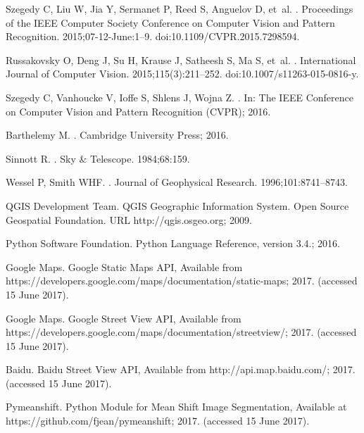 \documentclass[10pt,letterpaper]{article}
\begin{document}
\begin{thebibliography}{}
Szegedy C, Liu W, Jia Y, Sermanet P, Reed S, Anguelov D, et~al.
.
\newblock Proceedings of the IEEE Computer Society Conference on Computer
  Vision and Pattern Recognition. 2015;07-12-June:1--9.
\newblock doi:{10.1109/CVPR.2015.7298594}.

Russakovsky O, Deng J, Su H, Krause J, Satheesh S, Ma S, et~al.
.
\newblock International Journal of Computer Vision. 2015;115(3):211--252.
\newblock doi:{10.1007/s11263-015-0816-y}.

Szegedy C, Vanhoucke V, Ioffe S, Shlens J, Wojna Z.
.
\newblock In: The IEEE Conference on Computer Vision and Pattern Recognition
  (CVPR); 2016.

Barthelemy M.
.
\newblock Cambridge University Press; 2016.

Sinnott R.
.
\newblock Sky {\&} Telescope. 1984;68:159.

Wessel P, Smith WHF.
.
\newblock Journal of Geophysical Research. 1996;101:8741--8743.

{QGIS Development Team}. {QGIS Geographic Information System. Open Source
  Geospatial Foundation. URL http://qgis.osgeo.org}; 2009.

{Python Software Foundation}. {Python Language Reference, version 3.4.}; 2016.

{Google Maps}. {Google Static Maps API, Available from
  https://developers.google.com/maps/documentation/static-maps}; 2017.
\newblock (accessed 15 June 2017).

{Google Maps}. {Google Street View API, Available from
  https://developers.google.com/maps/documentation/streetview/}; 2017.
\newblock (accessed 15 June 2017).

Baidu. {Baidu Street View API, Available from http://api.map.baidu.com/}; 2017.
\newblock (accessed 15 June 2017).

Pymeanshift. {Python Module for Mean Shift Image Segmentation, Available at
  https://github.com/fjean/pymeanshift}; 2017.
\newblock (accessed 15 June 2017).


\end{thebibliography}
\end{document}
